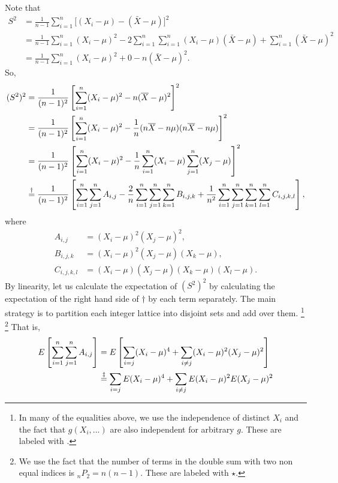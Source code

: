 \documentclass{stat_homework}
\begin{document}
  \begin{solution}
  Note that
  \begin{align*}
  S^2 &=\frac{1}{n-1}\sum_{i=1}^n\Big[(X_i-\mu) - (\bar X - \mu)\Big]^2\\
      &=\frac{1}{n-1}\sum_{i=1}^n(X_i- \mu)^2 - 2 \sum_{i=1}^n \sum_{i=1}^n(X_i - \mu)(\bar X - \mu) + \sum_{i=1}^n  (\bar X - \mu)^2\\
      &=\frac{1}{n-1}\sum_{i=1}^n(X_i- \mu)^2 + 0 - n(\bar X - \mu)^2.
  \end{align*}
  So,
  \begin{align}
  (S^2)^2 
    &=\frac{1}{(n-1)^2}\left[\sum_{i=1}^n(X_i- \mu)^2 - n(\overline X - \mu)^2\right]^2\nonumber\\
    &=\frac{1}{(n-1)^2}\left[\sum_{i=1}^n(X_i- \mu)^2 - \frac 1n (n \overline X - n \mu)(n \overline X - n\mu)\right]^2\nonumber\\
    &=\frac{1}{(n-1)^2}\left[\sum_{i=1}^n(X_i- \mu)^2 - \frac 1n \sum_{i=1}^n(X_i - \mu)\sum_{j=1}^n(X_j - \mu)\right]^2 \label{ssquare}\\
    &\stackrel{\dagger}{=}\frac{1}{(n-1)^2}\left[\sum_{i=1}^n\sum_{j=1}^n A_{i,j} - \frac 2n \sum_{i=1}^n\sum_{j=1}^n\sum_{k=1}^n B_{i,j,k} + \frac 1{n^2}\sum_{i=1}^n\sum_{j=1}^n\sum_{k=1}^n\sum_{l=1}^n C_{i,j,k,l}\right],\nonumber
  \end{align}
  where 
  \begin{align*}
    A_{i,j}  &= (X_i- \mu)^2(X_j-\mu)^2,\\ 
    B_{i,j,k} &= (X_i - \mu)^2(X_j - \mu)(X_k - \mu),\\
    C_{i,j,k,l} &= (X_i - \mu)(X_j - \mu)(X_k - \mu)(X_l - \mu).
  \end{align*}
  By linearity, let us calculate the expectation of $(S^2)^2$ by calculating the expectation of the right hand side of $\dagger$ by each term separately. The main strategy is to partition each integer lattice into disjoint sets and add over them.  \footnote{In many of the equalities above, we use the independence of distinct $X_i$ and the fact that $g(X_i,...)$ are also independent for arbitrary $g$. These are labeled with \textdaggerdbl.} \footnote{ We use the fact that the number of terms in the double sum with two non equal indices is $_nP_2 = n(n-1)$. These are labeled with $\star$.} That is,
  \begin{align*}
    E\left[\ssum A_{i,j}\right] 
    &= E\left[\sum_{i=j} (X_i-\mu)^4 + \sum_{i\not=j}(X_i-\mu)^2(X_j-\mu)^2\right]\\
    &\stackrel{\ddagger}{=} \sum_{i=j} E(X_i-\mu)^4 + \sum_{i\not=j}E(X_i-\mu)^2E(X_j-\mu)^2\\

\end{align*}
\end{solution}
\end{document}
